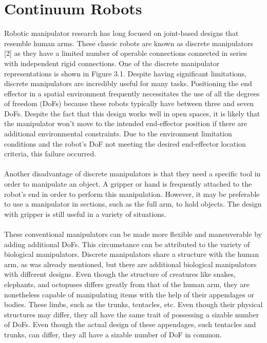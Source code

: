 \documentclass[12pt,twoside,a4]{mwbk}
\begin{document}
\section{Continuum Robots}
Robotic manipulator research has long focused on joint-based designs that resemble human arms. These classic robots are known as discrete manipulators [2] as they have a limited number of operable connections connected in series with independent rigid connections. One of the discrete manipulator representations is shown in Figure 3.1. Despite having significant limitations, discrete manipulators are incredibly useful for many tasks. Positioning the end effector in a spatial environment frequently necessitates the use of all the degrees of freedom (DoFs) because these robots typically have between three and seven DoFs. Despite the fact that this design works well in open spaces, it is likely that the manipulator won't move to the intended end-effector position if there are additional environmental constraints. Due to the environment limitation conditions and the robot's DoF not meeting the desired end-effector location criteria, this failure occurred.
\\ \\
Another disadvantage of discrete manipulators is that they need a specific tool in order to manipulate an object. A gripper or hand is frequently attached to the robot's end in order to perform this manipulation. However, it may be preferable to use a manipulator in sections, such as the full arm, to hold objects. The design with gripper is still useful in a variety of situations.
\\ \\
These conventional manipulators can be made more flexible and maneuverable by adding additional DoFs. This circumstance can be attributed to the variety of biological manipulators. Discrete manipulators share a structure with the human arm, as was already mentioned, but there are additional biological manipulators with different designs. Even though the structure of creatures like snakes, elephants, and octopuses differs greatly from that of the human arm, they are nonetheless capable of manipulating items with the help of their appendages or bodies. These limbs, such as the trunks, tentacles, etc. Even though their physical structures may differ, they all have the same trait of possessing a sizable number of DoFs. Even though the actual design of these appendages, such tentacles and trunks, can differ, they all have a sizable number of DoF in common.
\end{document}
